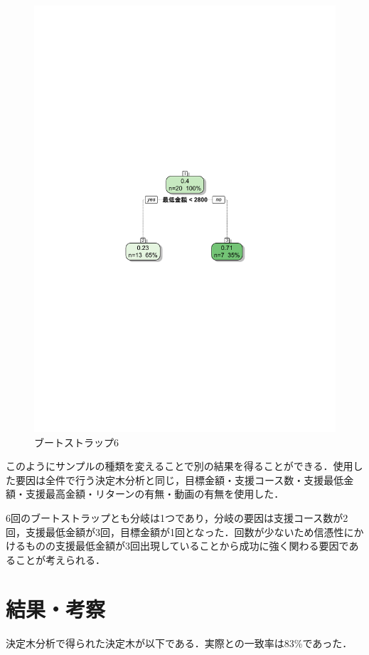 \begin{figure}[H]
\centering
\includegraphics[width=13cm]{figure52.pdf}
\caption{ブートストラップ6}\label{sannp}
\end{figure}

このようにサンプルの種類を変えることで別の結果を得ることができる．使用した要因は全件で行う決定木分析と同じ，目標金額・支援コース数・支援最低金額・支援最高金額・リターンの有無・動画の有無を使用した．

6回のブートストラップとも分岐は1つであり，分岐の要因は支援コース数が2回，支援最低金額が3回，目標金額が1回となった．回数が少ないため信憑性にかけるものの支援最低金額が3回出現していることから成功に強く関わる要因であることが考えられる．


\chapter{結果・考察}
決定木分析で得られた決定木が以下である．実際との一致率は83\%であった．


